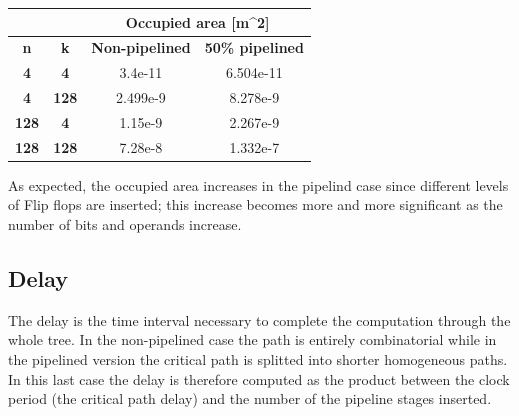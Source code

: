 \begin{center}
\begin{tabular}{cc|c|c|}
	\cline{3-4}
	\multicolumn{1}{l}{}               & \multicolumn{1}{l|}{} & \multicolumn{2}{c|}{\textbf{Occupied area {[}m\textasciicircum{}2{]}}} \\ \hline
	\multicolumn{1}{|c|}{\textbf{n}}   & \textbf{k}            & \textbf{Non-pipelined}            & \textbf{50\% pipelined}            \\ \hline
	\multicolumn{1}{|c|}{\textbf{4}}   & \textbf{4}            & 3.4e-11                           & 6.504e-11                          \\ \hline
	\multicolumn{1}{|c|}{\textbf{4}}   & \textbf{128}          & 2.499e-9                          & 8.278e-9                           \\ \hline
	\multicolumn{1}{|c|}{\textbf{128}} & \textbf{4}            & 1.15e-9                           & 2.267e-9                           \\ \hline
	\multicolumn{1}{|c|}{\textbf{128}} & \textbf{128}          & 7.28e-8                           & 1.332e-7                           \\ \hline
\end{tabular}

\end{center}
As expected, the occupied area increases in the pipelind case since different levels of Flip flops are inserted; this increase becomes more and more significant as the number of bits and operands increase.



\subsection{Delay}

The delay is the time interval necessary to complete the computation through the whole tree.
In the non-pipelined case the path is entirely combinatorial while in the pipelined version the critical path is splitted into shorter homogeneous paths. In this last case the delay is therefore computed as the product between the clock period (the critical path delay) and the number of the pipeline stages inserted.

